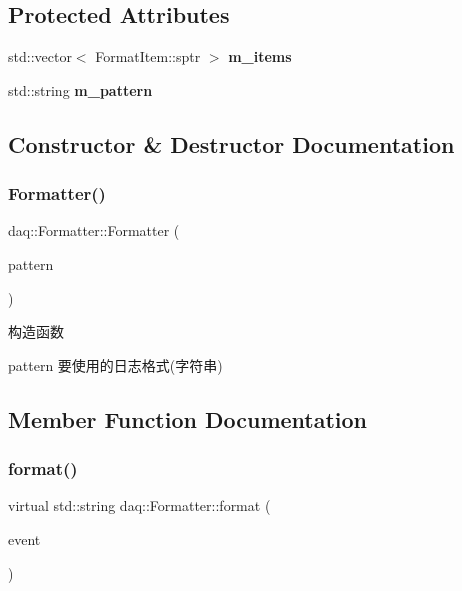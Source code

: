 \subsection*{Protected Attributes}
\begin{DoxyCompactItemize}
\item 
\mbox{\label{classdaq_1_1Formatter_a03814eb9c2073df5371b896402c9a925}} 
std\+::vector$<$ Format\+Item\+::sptr $>$ {\bfseries m\+\_\+items}
\item 
\mbox{\label{classdaq_1_1Formatter_a434129d1255aa29561d914b345f1e99a}} 
std\+::string {\bfseries m\+\_\+pattern}
\end{DoxyCompactItemize}


\subsection{Constructor \& Destructor Documentation}
\mbox{\label{classdaq_1_1Formatter_a62bedb8ff686edc0e19c1b6d9130e354}} 
\subsubsection{\texorpdfstring{Formatter()}{Formatter()}}
{\footnotesize\ttfamily daq\+::\+Formatter\+::\+Formatter (\begin{DoxyParamCaption}\item[{const std\+::string \&}]{pattern }\end{DoxyParamCaption})}



构造函数 

pattern 要使用的日志格式(字符串) 

\subsection{Member Function Documentation}
\mbox{\label{classdaq_1_1Formatter_ab060743da2f5e48c5021b10dfc3439d3}} 
\subsubsection{\texorpdfstring{format()}{format()}}
{\footnotesize\ttfamily virtual std\+::string daq\+::\+Formatter\+::format (\begin{DoxyParamCaption}\item[{Log\+Event\+::sptr}]{event }\end{DoxyParamCaption})\hspace{0.3cm}{\ttfamily [virtual]}}



